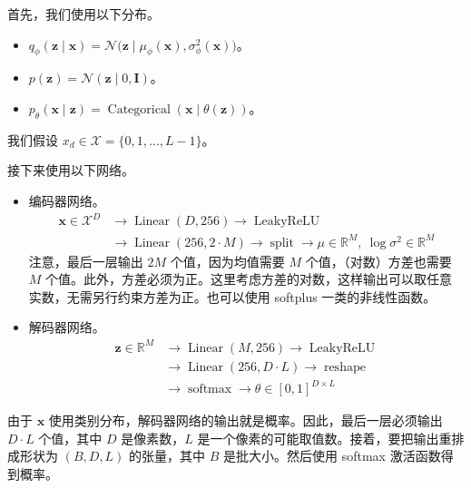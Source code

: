 首先，我们使用以下分布。
\begin{itemize}
\item $q_\phi(\mathbf{z}\mid\mathbf{x})=\mathcal{N}\bigl(\mathbf{z}\mid\mu_\phi(\mathbf{x}),\sigma_\phi^2(\mathbf{x})\bigr)$。
\item $p(\mathbf{z})=\mathcal{N}(\mathbf{z}\mid 0,\mathbf{I})$。
\item $p_\theta(\mathbf{x}\mid\mathbf{z})=\operatorname{Categorical}(\mathbf{x}\mid\theta(\mathbf{z}))$。
\end{itemize}
我们假设 $x_d\in\mathcal{X}=\{0,1,\ldots,L-1\}$。

接下来使用以下网络。
\begin{itemize}
\item 编码器网络。
\[
\begin{aligned}
\mathbf{x}\in\mathcal{X}^D &\to \operatorname{Linear}(D,256)
      \to\operatorname{LeakyReLU}\\
 &\to\operatorname{Linear}(256,2\cdot M)\to\operatorname{split}
      \to\mu\in\mathbb{R}^M,\ \log\sigma^2\in\mathbb{R}^M
\end{aligned}
\]
注意，最后一层输出 $2M$ 个值，因为均值需要 $M$ 个值，（对数）方差也需要 $M$ 个值。此外，方差必须为正。这里考虑方差的对数，这样输出可以取任意实数，无需另行约束方差为正。也可以使用 softplus 一类的非线性函数。
\item 解码器网络。
\[
\begin{aligned}
\mathbf{z}\in\mathbb{R}^M &\to\operatorname{Linear}(M,256)\to\operatorname{LeakyReLU}\\
 &\to\operatorname{Linear}(256,D\cdot L)\to\operatorname{reshape}\\
 &\to\operatorname{softmax}\to\theta\in[0,1]^{D\times L}
\end{aligned}
\]
\end{itemize}
由于 $\mathbf{x}$ 使用类别分布，解码器网络的输出就是概率。因此，最后一层必须输出 $D\cdot L$ 个值，其中 $D$ 是像素数，$L$ 是一个像素的可能取值数。接着，要把输出重排成形状为 $(B,D,L)$ 的张量，其中 $B$ 是批大小。然后使用 softmax 激活函数得到概率。

